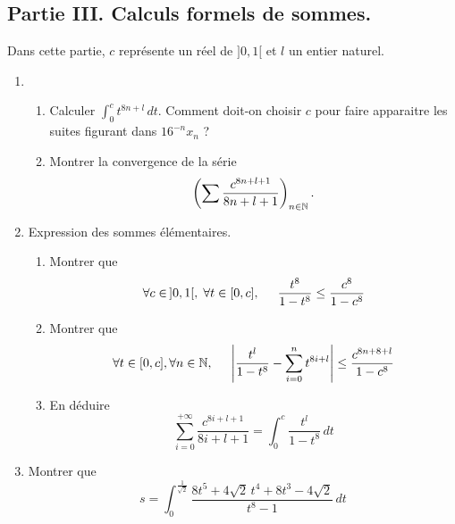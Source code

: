\subsection*{Partie III. Calculs formels de sommes.}
Dans cette partie, $c$ représente un réel de $]0,1[$ et $l$ un entier naturel.
\begin{enumerate}
 \item
\begin{enumerate}

 \item Calculer $\int_{0}^{c} t^{8n + l}\, dt$. Comment doit-on choisir $c$ pour faire apparaitre les suites figurant dans $16^{-n}x_n$ ?
 
 \item Montrer la convergence de la série 
\begin{displaymath}
 \left( \sum \frac{c^{8n+l+1}}{8n+l+1}\right)_{n\in \mathbb{N}}.
\end{displaymath}

\end{enumerate}
 
 \item Expression des sommes élémentaires.
\begin{enumerate}
 \item Montrer que 
\begin{displaymath}
 \forall c \in \,]0,1[, \;\forall t \in [0,c],\hspace{0.5cm} \frac{t^8}{1 - t^8} \leq \frac{c^8}{1 - c^8}
\end{displaymath}
 \item Montrer que 
\begin{displaymath}
\forall t \in [0,c], \forall n \in \mathbb{N},\hspace{0.5cm} \left| \frac{t^l}{1 - t^8} - \sum_{i=0}^n t^{8i+l}\right| \leq \frac{c^{8n+8+l}}{1-c^8} 
\end{displaymath}
  \item En déduire 
\begin{displaymath}
 \sum_{i=0}^{+\infty} \frac{c^{8i+l+1}}{8i + l + 1} = \int_{0}^{c}\frac{t^l}{1-t^8}\,dt
\end{displaymath}
\end{enumerate}

 \item Montrer que 
\begin{displaymath}
 s = 
\int_0^{\frac{1}{\sqrt{2}}}\frac{8t^5 + 4 \sqrt{2}\,t^4 + 8t^3 - 4\sqrt{2}}{t^8 -1}\, dt
\end{displaymath}


\end{enumerate}
